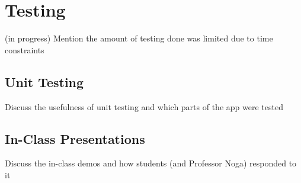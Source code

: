 \chapter{Testing}
(in progress) \newline
Mention the amount of testing done was limited due to time constraints
\section{Unit Testing}
Discuss the usefulness of unit testing and which parts of the app were tested
\section{In-Class Presentations}
Discuss the in-class demos and how students (and Professor Noga) responded to it